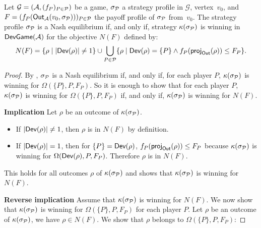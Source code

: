 \begin{theorem}\label{13-thm:dev-nash}
  Let \(\mathcal{G} = (\mathcal{A}, (f_P)_{P \in \mathcal{P}})\) be a game, \(\sigma_{\mathcal{P}}\) a strategy
  profile in \(\mathcal{G}\), vertex~$v_0$, and \(F = (f_P(\textsf{Out}_{\mathcal{A}}(v_0,\sigma_{\mathcal{P}})))_{P\in \mathcal{P}}\)
  the payoff
  profile of \(\sigma_{\mathcal{P}}\) from~$v_0$. The strategy profile \(\sigma_{\mathcal{P}}\) is a
  Nash equilibrium if, and only if, strategy \(\kappa(\sigma_{\mathcal{P}})\) is
  winning in \(\textsf{DevGame}(\mathcal{A})\) for the objective \(N(F)\) defined by:
  \[N(F) = \{\rho \mid |\textsf{Dev}(\rho)| \ne 1\}
    \cup \bigcup_{P\in \mathcal{P}} \{\rho \mid \textsf{Dev}(\rho) = \{P\}
    \land f_P(\textsf{proj}_{\textsf{Out}}(\rho)) \le F_P\}.\]
\end{theorem}
\begin{proof} By , \(\sigma_{\mathcal{P}}\) is a Nash
  equilibrium if, and only if, for each player \(P\),
  \(\kappa(\sigma_{\mathcal{P}})\) is winning for
  \(\Omega(\{P\}, P, F_P)\).
  So it is enough to show that for each player \(P\),
  \(\kappa(\sigma_{\mathcal{P}})\) is winning for
  \(\Omega(\{P\},P, F_P)\) if,
  and only if, \(\kappa(\sigma_{\mathcal{P}})\) is winning for \(N(F)\).

  \textbf{Implication} Let \(\rho\) be an outcome of
  \(\kappa(\sigma_{\mathcal{P}})\).

\begin{itemize}

\item   If \(|\textsf{Dev}(\rho)| \ne 1\), then \(\rho\) is in \(N(F)\) by
  definition.
\item   If \(|\textsf{Dev}(\rho)| = 1\), then for \(\{P\} = \textsf{Dev}(\rho)\),
  \(f_P(\textsf{proj}_{\textsf{Out}}(\rho)) \leq F_P\) because
  \(\kappa(\sigma_{\mathcal{P}})\) is winning for
  \(\Omega(\textsf{Dev}(\rho), P, F_P)\). Therefore \(\rho\) is
  in \(N(F)\).
\end{itemize}

This holds for all outcomes \(\rho\) of \(\kappa(\sigma_{\mathcal{P}})\) and shows
that \(\kappa(\sigma_{\mathcal{P}})\) is winning for \(N(F)\).

\textbf{Reverse implication} %
Assume that
\(\kappa(\sigma_{\mathcal{P}})\) is winning for \(N(F)\). We now show that
\(\kappa(\sigma_{\mathcal{P}})\) is winning for
\(\Omega(\{P\},P, F_P)\) for each player \(P\). Let
\(\rho\) be an outcome of \(\kappa(\sigma_{\mathcal{P}})\), we have
\(\rho \in N(F)\). We show that \(\rho\) belongs to
\(\Omega(\{P\}, P, F_P)\):


\end{proof}
